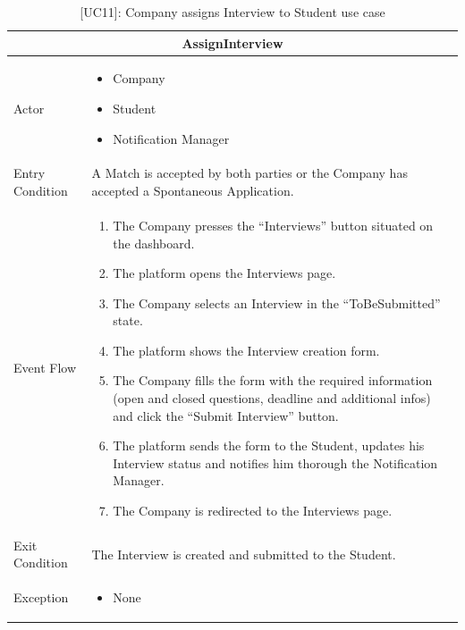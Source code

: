 \begin{table}[H]
    \centering
    \begin{tabular}{|p{3cm}|p{12cm}|}
    \hline
    \multicolumn{2}{|c|}{\textbf{AssignInterview}} \\ \hline
    Actor & 
    \begin{itemize}
        \item Company
        \item Student
        \item Notification Manager
    \end{itemize} \\ \hline
    Entry Condition & A Match is accepted by both parties or the Company has accepted a Spontaneous Application. \\ \hline
    Event Flow &      
    \begin{enumerate}         
        \item The Company presses the “Interviews” button situated on the dashboard.
        \item The platform opens the Interviews page.
        \item The Company selects an Interview in the “ToBeSubmitted” state.
        \item The platform shows the Interview creation form.
        \item The Company fills the form with the required information (open and closed questions, deadline and additional infos) and click the “Submit Interview” button.
        \item The platform sends the form to the Student, updates his Interview status and notifies him thorough the Notification Manager.
        \item The Company is redirected to the Interviews page.
    \end{enumerate} \\ \hline
    Exit Condition & The Interview is created and submitted to the Student. \\ \hline
    Exception & 
    \begin{itemize}         
        \item None
    \end{itemize} \\ \hline
    \end{tabular}
    \caption{[UC11]: Company assigns Interview to Student use case}
    \label{tab:UC11}
\end{table}

